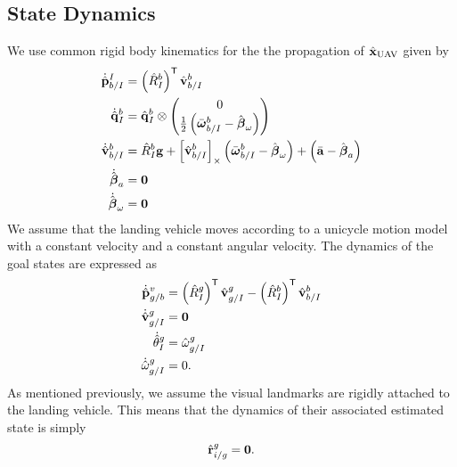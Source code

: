 
\subsection{State Dynamics}
We use common rigid body kinematics for the the propagation of
$\hat{\boldsymbol{\mathrm{x}}}_{\text{UAV}}$
given by
\begin{align}
  \dot{\hat{\boldsymbol{\mathrm{p}}}}_{b/I}^I
  &=
  \left( \hat{R}_I^b \right)^{\mathsf{T}} \hat{\boldsymbol{\mathrm{v}}}_{b/I}^b 
  \\
  \dot{\hat{\boldsymbol{\mathrm{q}}}}_{I}^{b} 
	&= 	
  \hat{\boldsymbol{\mathrm{q}}}_I^b \otimes \begin{pmatrix} 0 \\ \frac{1}{2}
  \left( \bar{\boldsymbol{\mathrm{\omega}}}_{b/I}^b - \hat{\boldsymbol{\mathrm{\beta}}}_\omega \right) \end{pmatrix} \\
  \dot{\hat{\boldsymbol{\mathrm{v}}}}_{b/I}^b 
  &=
  \hat{R}_I^b \boldsymbol{\mathrm{g}}
  +
  \left[ \hat{\boldsymbol{\mathrm{v}}}_{b/I}^b \right]_{\times}
  \left( \bar{\boldsymbol{\mathrm{\omega}}}_{b/I}^b - \hat{\boldsymbol{\mathrm{\beta}}}_\omega \right)
  +
  \left( \bar{\boldsymbol{\mathrm{a}}} - \hat{\boldsymbol{\mathrm{\beta}}}_a \right)
  \\
    \dot{\hat{\boldsymbol{\mathrm{\beta}}}}_a &= \boldsymbol{\mathrm{0}}
  \\
    \dot{\hat{\boldsymbol{\mathrm{\beta}}}}_\omega &= \boldsymbol{\mathrm{0}}
\end{align}
We assume that the landing vehicle moves according to a unicycle motion model
with a constant velocity and a constant
angular velocity. The dynamics of the goal states are expressed as
\begin{align}
  \dot{\hat{\boldsymbol{\mathrm{p}}}}_{g/b}^{v} &= \left( \hat{R}_{I}^{g} \right)^{\mathsf{T}}
  \hat{\boldsymbol{\mathrm{v}}}_{g/I}^{g} - \left( \hat{R}_{I}^{b} \right)^{\mathsf{T}}
  \hat{\boldsymbol{\mathrm{v}}}_{b/I}^{b} \\
  \dot{\hat{\boldsymbol{\mathrm{v}}}}_{g/I}^{g} &= \boldsymbol{\mathrm{0}} \\
  \dot{\hat{\theta}}_{I}^{g} &= \hat{\omega}_{g/I}^g \\
  \dot{\hat{\omega}}_{g/I}^{g} &= 0.
\end{align}
As mentioned previously, we assume the visual landmarks are rigidly
attached to the landing vehicle. This means that the dynamics of their
associated estimated state is simply
\begin{equation}
  \hat{\boldsymbol{\mathrm{r}}}_{i/g}^g = \boldsymbol{\mathrm{0}}.
\end{equation}

